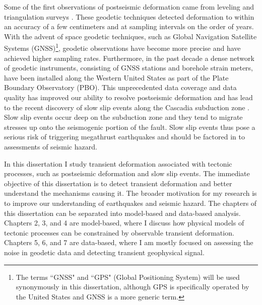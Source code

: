 Some of the first observations of postseismic deformation came from leveling and triangulation surveys \citep[e.g,][]{Kanamori1973,Thatcher1975}. These geodetic techniques detected deformation to within an accuracy of a few centimeters and at sampling intervals on the order of years. With the advent of space geodetic techniques, such as Global Navigation Satellite Systems (GNSS)\footnote{The terms ``GNSS" and ``GPS" (Global Positioning System) will be used synonymously in this dissertation, although GPS is specifically operated by the United States and GNSS is a more generic term.}, geodetic observations have become more precise and have achieved higher sampling rates. Furthermore, in the past decade a dense network of geodetic instruments, consisting of GNSS stations and borehole strain meters, have been installed along the Western United States as part of the Plate Boundary Observatory (PBO). This unprecedented data coverage and data quality has improved our ability to resolve postseismic deformation and has lead to the recent discovery of slow slip events along the Cascadia subduction zone \citep{Dragert2001}. Slow slip events occur deep on the subduction zone and they tend to migrate stresses up onto the seismogenic portion of the fault. Slow slip events thus pose a serious risk of triggering megathrust earthquakes and should be factored in to assessments of seismic hazard. 

In this dissertation I study transient deformation associated with tectonic processes, such as postseismic deformation and slow slip events. The immediate objective of this dissertation is to detect transient deformation and better understand the mechanisms causing it. The broader motivation for my research is to improve our understanding of earthquakes and seismic hazard. The chapters of this dissertation can be separated into model-based and data-based analysis. Chapters 2, 3, and 4 are model-based, where I discuss how physical models of tectonic processes can be constrained by observable transient deformation. Chapters 5, 6, and 7 are data-based, where I am mostly focused on assessing the noise in geodetic data and detecting transient geophysical signal.    

